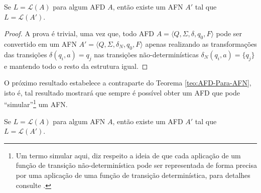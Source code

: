 \begin{theorem}\label{teo:AFD-Para-AFN}
	Se $L = \mathcal{L}(A)$ para algum AFD $A$, então existe um AFN $A'$ tal que $L = \mathcal{L}(A')$.
\end{theorem}

\begin{proof}
	A prova é trivial, uma vez que, todo AFD $A = \langle Q, \Sigma, \delta, q_0, F\rangle$ pode ser convertido em um AFN $A' = \langle Q, \Sigma, \delta_N, q_0, F\rangle$ apenas realizando as transformações das transições $\delta(q_i, a) = q_j$ nas transições não-determinísticas $\delta_N(q_i, a) = \{q_j\}$ e mantendo todo o resto da estrutura igual.
\end{proof}

O próximo resultado estabelece a contraparte do Teorema \ref{teo:AFD-Para-AFN}, isto é, tal resultado mostrará que sempre é possível obter um AFD que pode ``simular''\footnote{Um termo simular aqui, diz respeito a ideia de que cada aplicação de um função de transição não-determinística pode ser representada de forma precisa por uma aplicação de uma função de transição determinística, para detalhes consulte \cite{hopcroft2008, menezes1998LFA}.} um AFN.

\begin{theorem}\label{teo:AFN-Para-AFD}
	Se $L = \mathcal{L}(A)$ para algum AFN $A$, então existe um AFD $A'$ tal que $L = \mathcal{L}(A')$.
\end{theorem}

